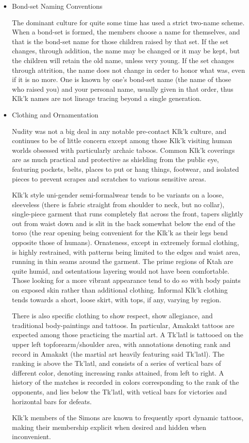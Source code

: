 \begin{itemize}
\item Bond-set Naming Conventions

The dominant culture for quite some time has used a strict two-name
scheme. When a bond-set is formed, the members choose a name for
themselves, and that is the bond-set name for those children raised by
that set. If the set changes, through addition, the name may be
changed or it may be kept, but the children will retain the old name,
unless very young. If the set changes through attrition, the name does
not change in order to honor what was, even if it is no more. One is
known by one's bond-set name (the name of those who raised you) and
your personal name, usually given in that order, thus Klk'k names are
not lineage tracing beyond a single generation.

\item Clothing and Ornamentation

Nudity was not a big deal in any notable pre-contact Klk'k culture,
and continues to be of little concern except among those Klk'k
visiting human worlds obsessed with particularly archaic
taboos. Common Klk'k coverings are as much practical and protective as
shielding from the public eye, featuring pockets, belts, places to put
or hang things, footwear, and isolated pieces to prevent scrapes and
scratches to various sensitive areas.

Klk'k style uni-gender semi-formalwear tends to be variants on a
loose, sleeveless (there is fabric straight from shoulder to neck, but
no collar), single-piece garment that runs completely flat across the
front, tapers slightly out from waist down and is slit in the back
somewhat below the end of the torso (the rear opening being convenient
for the Klk'k as their legs bend opposite those of
humans). Ornateness, except in extremely formal clothing, is highly
restrained, with patterns being limited to the edges and waist area,
running in thin seams around the garment. The prime regions of Ktah
are quite humid, and ostentatious layering would not have been
comfortable. Those looking for a more vibrant appearance tend to do so
with body paints on exposed skin rather than additional
clothing. Informal Klk'k clothing tends towards a short, loose skirt,
with tops, if any, varying by region.

There is also specific clothing to show respect, show allegiance, and
traditional body-paintings and tattoos. In particular, Amakakt tattoos
are expected among those practicing the martial art. A Tk'latl is
tattooed on the upper left topforearm/shoulder area, with annotations
denoting rank and record in Amakakt (the martial art heavily featuring
said Tk'latl). The ranking is above the Tk'latl, and consists of a
series of vertical bars of different color, denoting increasing ranks
attained, from left to right. A history of the matches is recorded in
colors corresponding to the rank of the opponents, and lies below the
Tk'latl, with vetical bars for victories and horizontal bars for
defeats.

Klk'k members of the Simons are known to frequently sport dynamic
tattoos, making their membership explicit when desired and hidden when
inconvenient.
\end{itemize}

